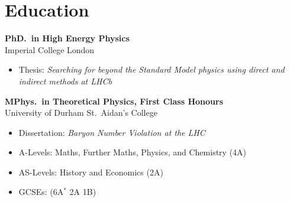 \section{Education}

{
  \textbf{PhD.~in High Energy Physics} \\
  {Imperial College London {\color{color2} }} \\
  \begin{itemize}
    \item {
      Thesis:
      \textit{Searching for beyond the Standard Model physics using direct and indirect methods at LHCb}
    }
  \end{itemize}
}

\vspace{-1em}

{
  \textbf{MPhys.~in Theoretical Physics, First Class Honours} \\
  {University of Durham {\color{color2} St.~Aidan's College}} \\
  \begin{itemize}
    \item Dissertation:
      \textit{Baryon Number Violation at the LHC}
  \end{itemize}
}

\vspace{-1em}

{
  \begin{itemize}
    \item A-Levels: Maths, Further Maths, Physics, and Chemistry (4A)
    \item AS-Levels: History and Economics (2A)
    \item GCSEs: (6A$\!^*$ 2A 1B)
  \end{itemize}
}

\vspace{-1em}
